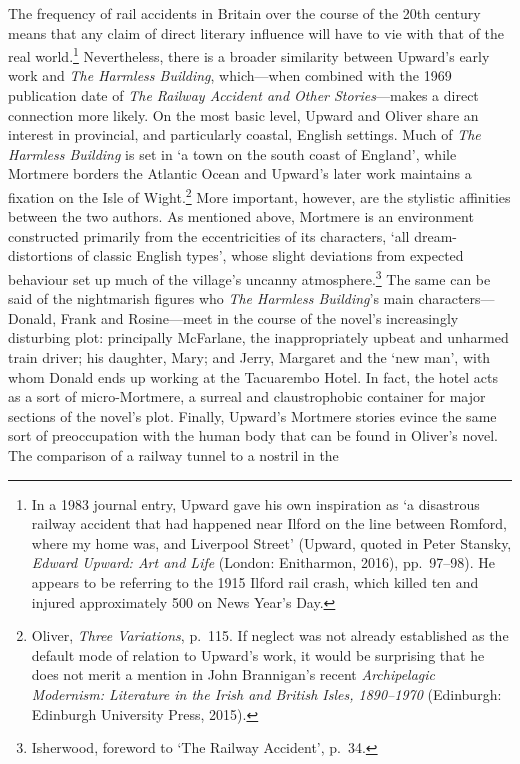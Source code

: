 \documentclass[]{article}
\begin{document}
The frequency of rail accidents in Britain over the course of the 20th
century means that any claim of direct literary influence will have to
vie with that of the real world.\footnote{In a 1983 journal entry,
  Upward gave his own inspiration as `a disastrous railway accident that
  had happened near Ilford on the line between Romford, where my home
  was, and Liverpool Street' (Upward, quoted in Peter Stansky,
  \emph{Edward Upward: Art and Life} (London: Enitharmon, 2016),
  pp.~97--98). He appears to be referring to the 1915 Ilford rail crash,
  which killed ten and injured approximately 500 on News Year's Day.}
Nevertheless, there is a broader similarity between Upward's early work
and \emph{The Harmless Building}, which---when combined with the 1969
publication date of \emph{The Railway Accident and Other
Stories}---makes a direct connection more likely. On the most basic
level, Upward and Oliver share an interest in provincial, and
particularly coastal, English settings. Much of \emph{The Harmless
Building} is set in `a town on the south coast of England', while
Mortmere borders the Atlantic Ocean and Upward's later work maintains a
fixation on the Isle of Wight.\footnote{Oliver, \emph{Three Variations},
  p.~115. If neglect was not already established as the default mode of
  relation to Upward's work, it would be surprising that he does not
  merit a mention in John Brannigan's recent \emph{Archipelagic
  Modernism: Literature in the Irish and British Isles, 1890--1970}
  (Edinburgh: Edinburgh University Press, 2015).} More important,
however, are the stylistic affinities between the two authors. As
mentioned above, Mortmere is an environment constructed primarily from
the eccentricities of its characters, `all dream-distortions of classic
English types', whose slight deviations from expected behaviour set up
much of the village's uncanny atmosphere.\footnote{Isherwood, foreword
  to `The Railway Accident', p.~34.} The same can be said of the
nightmarish figures who \emph{The Harmless Building}'s main
characters---Donald, Frank and Rosine---meet in the course of the
novel's increasingly disturbing plot: principally McFarlane, the
inappropriately upbeat and unharmed train driver; his daughter, Mary;
and Jerry, Margaret and the `new man', with whom Donald ends up working
at the Tacuarembo Hotel. In fact, the hotel acts as a sort of
micro-Mortmere, a surreal and claustrophobic container for major
sections of the novel's plot. Finally, Upward's Mortmere stories evince
the same sort of preoccupation with the human body that can be found in
Oliver's novel. The comparison of a railway tunnel to a nostril in the
\end{document}
